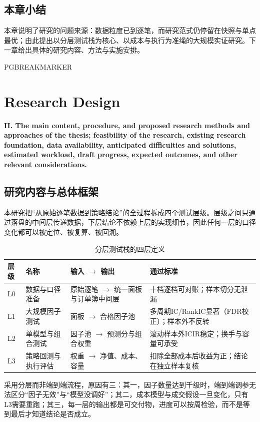 \documentclass[11pt,a4paper]{article}
\begin{document}
\subsection*{本章小结}

本章说明了研究的问题来源：数据粒度已到逐笔，而研究范式仍停留在快照与单点最优；由此提出以分层测试栈为核心、以成本与执行为准绳的大规模实证研究。下一章给出具体的研究内容、方法与实施安排。


PGBREAKMARKER

\section*{Research Design}

{\raggedright \textbf{II. The main content, procedure, and proposed research methods and approaches of the thesis; feasibility of the research, existing research foundation, data availability, anticipated difficulties and solutions, estimated workload, draft progress, expected outcomes, and other relevant considerations.}\par}

\subsection*{研究内容与总体框架}

本研究把``从原始逐笔数据到策略结论''的全过程拆成四个测试层级。层级之间只通过落盘的中间层传递数据，下层结论不依赖上层的实现细节，因此任何一层的口径变化都可以被定位、被复算、被回溯。

\begin{table}
  \caption{分层测试栈的四层定义}
  \begin{tabular}{llll}
    \toprule
    层级 & 名称 & 输入 $\to$ 输出 & 通过标准 \\
    \midrule
    L0 & 数据与口径准备 & 原始逐笔 $\to$ 统一面板与订单簿中间层& 十档逐档可对账；样本切分无泄漏 \\
    L1 & 大规模因子测试 & 面板 $\to$ 合格因子池& 多周期IC/RankIC显著（FDR校正）；样本外不反转 \\
    L2 & 单模型与组合测试 & 因子池 $\to$ 预测分与组合权重& 滚动样本外ICIR稳定；换手与容量可承受 \\
    L3 & 策略回测与执行评估 & 权重 $\to$ 净值、成本、容量& 扣除全部成本后收益为正；结论在独立样本复核 \\
    \bottomrule
  \end{tabular}
\end{table}

采用分层而非端到端流程，原因有三：其一，因子数量达到千级时，端到端调参无法区分``因子无效''与``模型没调好''；其二，成本模型与成交假设一旦变化，只有L3需要重跑；其三，每一层的输出都是可交付物，进度可以按周检验，而不是等到最后才知道结论是否成立。
\end{document}
